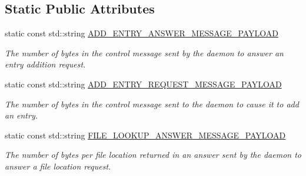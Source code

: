 \subsection*{Static Public Attributes}
\begin{DoxyCompactItemize}
\item 
\mbox{\label{classwrench_1_1_file_registry_service_message_payload_a4db8dcf568d85fafc162d0d192658e50}} 
static const std\+::string \hyperlink{classwrench_1_1_file_registry_service_message_payload_a4db8dcf568d85fafc162d0d192658e50}{A\+D\+D\+\_\+\+E\+N\+T\+R\+Y\+\_\+\+A\+N\+S\+W\+E\+R\+\_\+\+M\+E\+S\+S\+A\+G\+E\+\_\+\+P\+A\+Y\+L\+O\+AD}
\begin{DoxyCompactList}\small\item\em The number of bytes in the control message sent by the daemon to answer an entry addition request. \end{DoxyCompactList}\item 
\mbox{\label{classwrench_1_1_file_registry_service_message_payload_ab2f9e325d2f97dc073f13ce34091cae8}} 
static const std\+::string \hyperlink{classwrench_1_1_file_registry_service_message_payload_ab2f9e325d2f97dc073f13ce34091cae8}{A\+D\+D\+\_\+\+E\+N\+T\+R\+Y\+\_\+\+R\+E\+Q\+U\+E\+S\+T\+\_\+\+M\+E\+S\+S\+A\+G\+E\+\_\+\+P\+A\+Y\+L\+O\+AD}
\begin{DoxyCompactList}\small\item\em The number of bytes in the control message sent to the daemon to cause it to add an entry. \end{DoxyCompactList}\item 
\mbox{\label{classwrench_1_1_file_registry_service_message_payload_a17ec53dbb0ffdbc1245deac83817ba98}} 
static const std\+::string \hyperlink{classwrench_1_1_file_registry_service_message_payload_a17ec53dbb0ffdbc1245deac83817ba98}{F\+I\+L\+E\+\_\+\+L\+O\+O\+K\+U\+P\+\_\+\+A\+N\+S\+W\+E\+R\+\_\+\+M\+E\+S\+S\+A\+G\+E\+\_\+\+P\+A\+Y\+L\+O\+AD}
\begin{DoxyCompactList}\small\item\em The number of bytes per file location returned in an answer sent by the daemon to answer a file location request. \end{DoxyCompactList}\item 

\end{DoxyCompactItemize}
